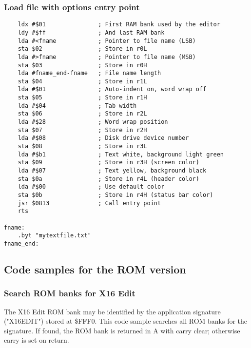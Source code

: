 \documentclass{article}
\begin{document}
\subsubsection{Load file with options entry point}
\begin{verbatim}
    ldx #$01               ; First RAM bank used by the editor
    ldy #$ff               ; And last RAM bank
    lda #<fname            ; Pointer to file name (LSB)
    sta $02                ; Store in r0L
    lda #>fname            ; Pointer to file name (MSB)
    sta $03                ; Store in r0H
    lda #fname_end-fname   ; File name length
    sta $04                ; Store in r1L
    lda #$01               ; Auto-indent on, word wrap off
    sta $05                ; Store in r1H
    lda #$04               ; Tab width
    sta $06                ; Store in r2L
    lda #$28               ; Word wrap position
    sta $07                ; Store in r2H
    lda #$08               ; Disk drive device number
    sta $08                ; Store in r3L
    lda #$b1               ; Text white, background light green
    sta $09                ; Store in r3H (screen color)
    lda #$07               ; Text yellow, background black
    sta $0a                ; Store in r4L (header color)
    lda #$00               ; Use default color
    sta $0b                ; Store in r4H (status bar color)
    jsr $0813              ; Call entry point
    rts

fname:
    .byt "mytextfile.txt"
fname_end:
\end{verbatim}

    \subsection{Code samples for the ROM version}
    
    \subsubsection{Search ROM banks for X16 Edit}

    The X16 Edit ROM bank may be identified by the
    application signature ("X16EDIT") stored at \$FFF0. This
    code sample searches all ROM banks for the signature.
    If found, the ROM bank is returned in A with carry clear; otherwise
    carry is set on return.
\end{document}
